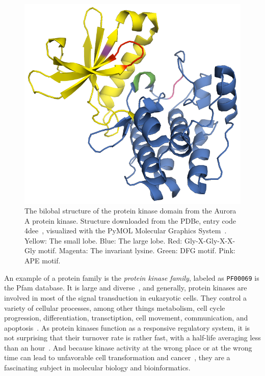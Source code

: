   \begin{figure}
    \centering
    \includegraphics[width=0.8\linewidth]{img/aurora.png}
    \caption{The bilobal structure of the protein kinase domain from the Aurora A protein
    kinase.
    Structure downloaded from the PDBe, entry code 4dee~\cite{lawrence2012development},
    visualized with the PyMOL Molecular Graphics System~\cite{PyMOL}.
    Yellow: The small lobe.
    Blue: The large lobe.
    Red: Gly-X-Gly-X-X-Gly motif.
    Magenta: The invariant lysine.
    Green: DFG motif.
    Pink: APE motif.
    }
    \label{fig:aurora}
  \end{figure}

  An example of a protein family is the \emph{protein kinase family}, labeled as
  \texttt{PF00069} is the Pfam database.
  It is large and diverse~\cite{hanks1988protein, hunter19911}, and generally, protein
  kinases are involved in most of the signal transduction in eukaryotic cells.
  They control a variety of cellular processes, among other things metabolism, cell cycle
  progression, differentiation, transctiption, cell movement, communication, and
  apoptosis~\cite{kemp2003amp, matsuoka1998linkage, johnson1994sequential,
  vermeulen2003transcriptional, chen1994cell, warn1998regulation, cross2000serine}.
  As protein kinases function as a responsive regulatory system, it is not surprising that
  their turnover rate is rather fast, with a half-life averaging less than an
  hour~\cite{hunter1982phosphotyrosine}.
  And because kinase activity at the wrong place or at the wrong time can lead to
  unfavorable cell transformation and cancer~\cite{koivunen2006protein,
  caretta2011protein}, they are a fascinating subject in molecular biology and
  bioinformatics.

